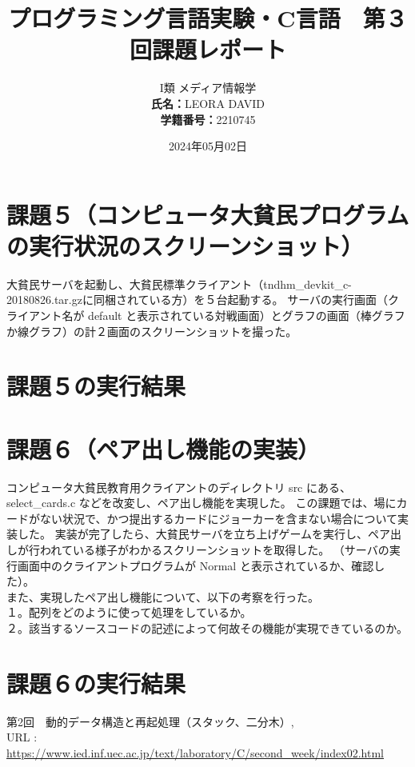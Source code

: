 \documentclass[]{jsarticle}
\title{\vspace{-3cm} プログラミング言語実験・C言語　第３回課題レポート}
\author{I類 メディア情報学 \\\textbf{氏名：}LEORA DAVID\\\textbf{学籍番号：}2210745}
\date{2024年05月02日}
\begin{document}
\maketitle

\section*{課題５（コンピュータ大貧民プログラムの実行状況のスクリーンショット）}
大貧民サーバを起動し、大貧民標準クライアント（tndhm\_devkit\_c-20180826.tar.gzに同梱されている方）を５台起動する。
サーバの実行画面（クライアント名が default と表示されている対戦画面）とグラフの画面（棒グラフか線グラフ）の計２画面のスクリーンショットを撮った。\\


\section*{課題５の実行結果}

\newpage
\section*{課題６（ペア出し機能の実装）}
コンピュータ大貧民教育用クライアントのディレクトリ src にある、select\_cards.c などを改変し、ペア出し機能を実現した。
この課題では、場にカードがない状況で、かつ提出するカードにジョーカーを含まない場合について実装した。
実装が完了したら、大貧民サーバを立ち上げゲームを実行し、ペア出しが行われている様子がわかるスクリーンショットを取得した。
（サーバの実行画面中のクライアントプログラムが Normal と表示されているか、確認した）。\\

\noindent また、実現したペア出し機能について、以下の考察を行った。\\
１。配列をどのように使って処理をしているか。\\
２。該当するソースコードの記述によって何故その機能が実現できているのか。\\

\section*{課題６の実行結果}



\newpage
\begin{thebibliography}{99}
   第2回　動的データ構造と再起処理（スタック、二分木）, \\URL : \url{https://www.ied.inf.uec.ac.jp/text/laboratory/C/second_week/index02.html}
\end{thebibliography}
\end{document}
